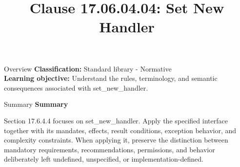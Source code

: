 \documentclass[10pt,letterpaper]{article}
\title{Clause 17.06.04.04: Set New Handler}
\author{}
\date{}
\begin{document}
\maketitle
\begin{CornellOverviewBox}{Overview}
\textbf{Classification:} Standard library - Normative\\[2pt]
\textbf{Learning objective:} Understand the rules, terminology, and semantic consequences associated with set\_new\_handler.
\end{CornellOverviewBox}\begin{CornellSummaryBox}{Summary}
{\sffamily\bfseries\color{Accent} Summary}\par\vspace{3pt}Section 17.6.4.4 focuses on set\_new\_handler. Apply the specified interface together with its mandates, effects, result conditions, exception behavior, and complexity constraints. When applying it, preserve the distinction between mandatory requirements, recommendations, permissions, and behavior deliberately left undefined, unspecified, or implementation-defined.
\end{CornellSummaryBox}
\end{document}
